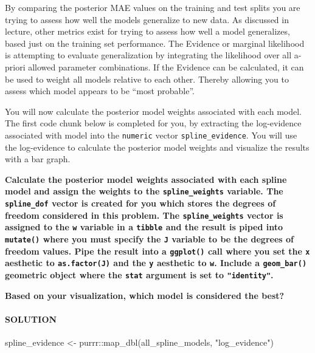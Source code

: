 \documentclass[
]{article}
\newenvironment{Shaded}{\begin{snugshade}}{\end{snugshade}}
\newcommand{\FunctionTok}[1]{\textcolor[rgb]{0.00,0.00,0.00}{#1}}
\newcommand{\NormalTok}[1]{#1}
\newcommand{\OtherTok}[1]{\textcolor[rgb]{0.56,0.35,0.01}{#1}}
\newcommand{\SpecialCharTok}[1]{\textcolor[rgb]{0.00,0.00,0.00}{#1}}
\newcommand{\StringTok}[1]{\textcolor[rgb]{0.31,0.60,0.02}{#1}}
\begin{document}
By comparing the posterior MAE values on the training and test splits
you are trying to assess how well the models generalize to new data. As
discussed in lecture, other metrics exist for trying to assess how well
a model generalizes, based just on the training set performance. The
Evidence or marginal likelihood is attempting to evaluate generalization
by integrating the likelihood over all a-priori allowed parameter
combinations. If the Evidence can be calculated, it can be used to
weight all models relative to each other. Thereby allowing you to assess
which model appears to be ``most probable''.

You will now calculate the posterior model weights associated with each
model. The first code chunk below is completed for you, by extracting
the log-evidence associated with model into the \texttt{numeric} vector
\texttt{spline\_evidence}. You will use the log-evidence to calculate
the posterior model weights and visualize the results with a bar graph.

\textbf{Calculate the posterior model weights associated with each
spline model and assign the weights to the \texttt{spline\_weights}
variable. The \texttt{spline\_dof} vector is created for you which
stores the degrees of freedom considered in this problem. The
\texttt{spline\_weights} vector is assigned to the \texttt{w} variable
in a \texttt{tibble} and the result is piped into \texttt{mutate()}
where you must specify the \texttt{J} variable to be the degrees of
freedom values. Pipe the result into a \texttt{ggplot()} call where you
set the \texttt{x} aesthetic to \texttt{as.factor(J)} and the \texttt{y}
aesthetic to \texttt{w}. Include a \texttt{geom\_bar()} geometric object
where the \texttt{stat} argument is set to \texttt{"identity"}.}

\textbf{Based on your visualization, which model is considered the
best?}

\hypertarget{solution-17}{%
\paragraph{SOLUTION}\label{solution-17}}

\begin{Shaded}
\begin{Highlighting}[]
\NormalTok{spline\_evidence }\OtherTok{\textless{}{-}}\NormalTok{ purrr}\SpecialCharTok{::}\FunctionTok{map\_dbl}\NormalTok{(all\_spline\_models, }\StringTok{"log\_evidence"}\NormalTok{)}
\end{Highlighting}
\end{Shaded}
\end{document}
